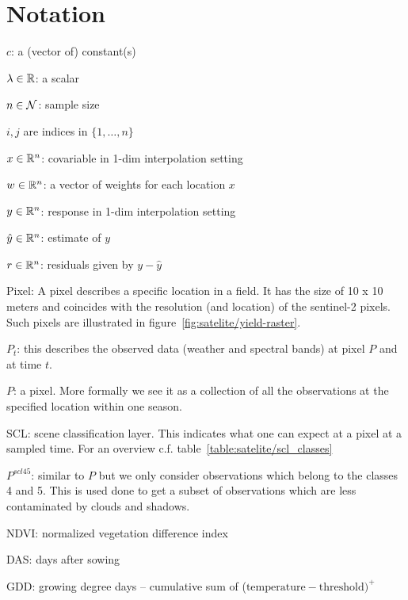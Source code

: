 \chapter*{Notation}
\label{c:Notation}

$c$: a (vector of) constant(s)

$\lambda \in \mathbb{R}$: a scalar

$n\in \operatorname{\mathcal{N}}$: sample size

$i,j$ are indices in $\{1,\dots,n\}$

$x\in \mathbb{R}^n$: covariable in 1-dim interpolation setting

$w \in \mathbb{R}^n$: a vector of weights for each location $x$

$y\in \mathbb{R}^n$: response in 1-dim interpolation setting

$\hat y\in \mathbb{R}^n$: estimate of $y$

$r \in \mathbb{R}^n$: residuals given by $y - \hat y$



Pixel: A pixel describes a specific location in a field. It has the size of 10 x 10 meters and coincides with the resolution (and location) of the sentinel-2 pixels. Such pixels are illustrated in figure~\ref{fig:satelite/yield-raster}.

$P_t$: this describes the observed data (weather and spectral bands) at pixel $P$ and at time $t$.

$P$: a pixel. More formally we see it as a collection of all the observations at the specified location within one season. %

SCL: scene classification layer. This indicates what one can expect at a pixel at a sampled time. For an overview c.f. table~\ref{table:satelite/scl_classes}

$P^{scl45}$: similar to $P$ but we only consider observations which belong to the classes 4 and 5. This is used done to get a subset of observations which are less contaminated by clouds and shadows.

NDVI: normalized vegetation difference index

DAS: days after sowing

GDD: growing degree days -- cumulative sum of ($\text{temperature}-\text{threshold})^+$



